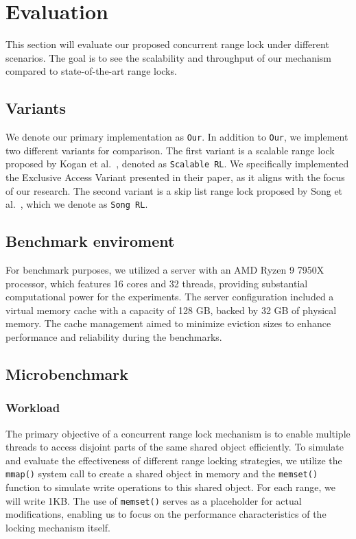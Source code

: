 \chapter{Evaluation}\label{chapter:evaluation}

This section will evaluate our proposed concurrent range lock under different scenarios. 
The goal is to see the scalability and throughput of our mechanism compared to state-of-the-art range locks.

\section{Variants}

We denote our primary implementation as \texttt{Our}. 
In addition to \texttt{Our}, we implement two different variants for comparison. 
The first variant is a scalable range lock proposed by Kogan et al.~\parencite{kogan2020scalable}, denoted as \texttt{Scalable RL}. 
We specifically implemented the Exclusive Access Variant presented in their paper, as it aligns with the focus of our research. 
The second variant is a skip list range lock proposed by Song et al.~\parencite{song2013parallelizing}, which we denote as \texttt{Song RL}.

\section{Benchmark enviroment}

For benchmark purposes, we utilized a server with an AMD Ryzen 9 7950X processor, which features 16 cores and 32 threads, providing substantial computational power for the experiments. 
The server configuration included a virtual memory cache with a capacity of 128 GB, backed by 32 GB of physical memory. 
The cache management aimed to minimize eviction sizes to enhance performance and reliability during the benchmarks.

\section{Microbenchmark}\label{sec:microbenchmark}

\subsection{Workload}\label{subsec:workload}
The primary objective of a concurrent range lock mechanism is to enable multiple threads to access disjoint parts of the same shared object efficiently. 
To simulate and evaluate the effectiveness of different range locking strategies, we utilize the \texttt{mmap()} system call to create a shared object in memory and the \texttt{memset()} function to simulate write operations to this shared object. 
For each range, we will write 1KB. 
The use of \texttt{memset()} serves as a placeholder for actual modifications, enabling us to focus on the performance characteristics of the locking mechanism itself.

